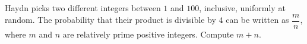 Haydn picks two different integers between $1$ and $100$, inclusive, uniformly at random. The probability that their product is divisible by $4$ can be written as $\dfrac mn$, where $m$ and $n$ are relatively prime positive integers. Compute $m+n$.

